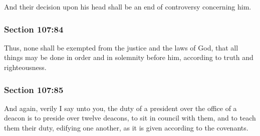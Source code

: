 		And their decision upon his head shall be an end of controversy concerning him.


	\subsubsection{Section 107:84} %
		\label{DC107-84}

		Thus, none shall be exempted from the justice and the laws of God, that all things may be done in order and in solemnity before him, according to truth and righteousness.


	\subsubsection{Section 107:85} %
		\label{DC107-85}

		And again, verily I say unto you, the duty of a president over the office of a deacon is to preside over twelve deacons, to sit in council with them, and to teach them their duty, edifying one another, as it is given according to the covenants.


